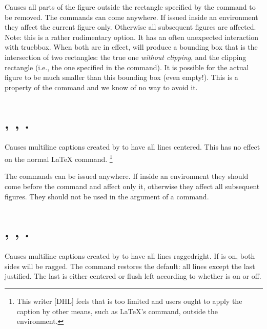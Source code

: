 \documentclass[letterpaper]{article}
\begin{document}
Causes all parts of the figure outside the rectangle specified by the
 command to be removed. The commands can come anywhere. If
issued inside an  environment they affect the current figure
only. Otherwise all subsequent figures are affected. Note: this is a
rather rudimentary option. It has an often unexpected interaction with
truebbox. When both are in effect, \MP{} will produce a bounding box
that is the intersection of two rectangles: the true one \emph{without
clipping}, and the clipping rectangle (i.e., the one specified in the
 command). It is possible for the actual figure to be much
smaller than this bounding box (even empty!). This is a property of the
\MP{}  command and we know of no way to avoid it.


\section{, ,
.}\label{centeredcaptions}
%
%

Causes multiline captions created by  to have all lines
centered. This has no effect on the normal \LaTeX{} 
command.%
    \footnote{This writer [DHL] feels that  is too limited
    and users ought to apply the caption by other means, such as
    \LaTeX{}'s  command, outside the 
    environment.}%

The commands can be issued anywhere. If inside an 
environment they should come before the  command and affect
only it, otherwise they affect all subsequent figures. They should not
be used in the argument of a  command.

\section{, ,
.}\label{raggedcaptions}
%
%

Causes multiline captions created by  to have all lines
raggedright. If  is on, both sides will be ragged.
The command  restores the default: all lines except
the last justified. The last is either centered or flush left according
to whether  is on or off.
\end{document}
